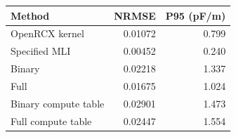 \begin{tabular}{lrr}
\toprule
Method & NRMSE & P95 (pF/m) \\
\midrule
OpenRCX kernel & 0.01072 & 0.799 \\
Specified MLI & 0.00452 & 0.240 \\
Binary & 0.02218 & 1.337 \\
Full & 0.01675 & 1.024 \\
Binary compute table & 0.02901 & 1.473 \\
Full compute table & 0.02447 & 1.554 \\
\bottomrule
\end{tabular}
